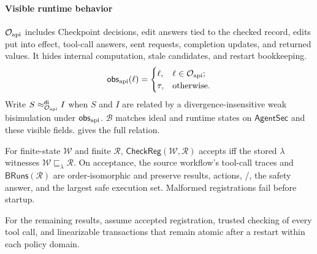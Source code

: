 \paragraph{Visible runtime behavior}
\(\mathcal O_{\rm api}\) includes Checkpoint decisions, edit answers tied to the checked record, edits put into effect, tool-call answers, sent requests, completion updates, and returned values.
It hides internal computation, stale candidates, and restart bookkeeping.
\[
\mathsf{obs}_{\rm api}(\ell)=
\begin{cases}
\ell,&\ell\in\mathcal O_{\rm api};\\
\tau,&\text{otherwise}.
\end{cases}
\]
Write \(S\approx_{\mathcal O_{\rm api}}^{\mathsf{di}}I\) when \(S\) and \(I\) are related by a divergence-insensitive weak bisimulation under \(\mathsf{obs}_{\rm api}\).
\(\mathcal B\) matches ideal and runtime states on \(\mathsf{AgentSec}\) and these visible fields.
 gives the full relation.

\begin{theorem}
\label{thm:faithful-registration}
For finite-state \(\mathcal W\) and finite \(\mathcal R\),
\(\mathsf{CheckReg}(\mathcal W,\mathcal R)\) accepts iff the stored \(\lambda\) witnesses \(\mathcal W\sqsubseteq_\lambda\mathcal R\).
On acceptance, the source workflow's tool-call traces and \(\mathsf{BRuns}(\mathcal R)\) are order-isomorphic and preserve results, actions, \Fresh/\Alias, the safety answer, and the largest safe execution set.
Malformed registrations fail before startup.
\end{theorem}

For the remaining results, assume accepted registration, trusted checking of every tool call, and linearizable transactions that remain atomic after a restart within each policy domain.


